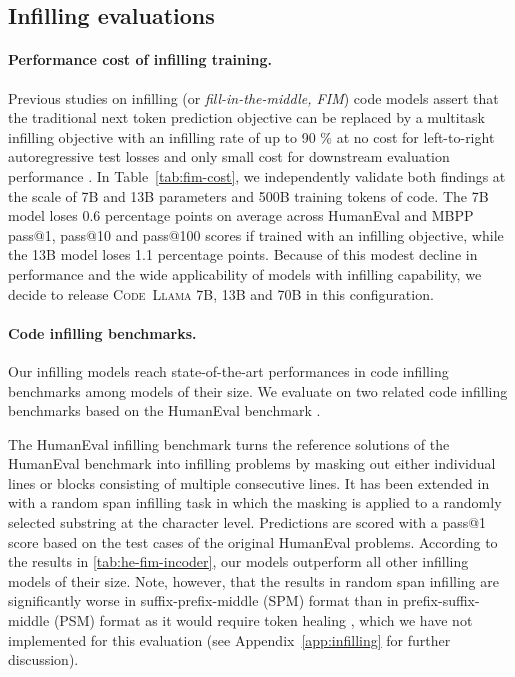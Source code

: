 \subsection{Infilling evaluations}\label{sec:infilling_evals}

\label{sec:fim_results}
\paragraph{Performance cost of infilling training.} Previous studies on infilling (or \emph{fill-in-the-middle, FIM}) code models assert that the traditional next token prediction objective can be replaced by a multitask infilling objective with an infilling rate of up to 90 \% at no cost for left-to-right autoregressive test losses \citep{bavarian2022efficient} and only small cost for downstream evaluation performance \citep{allal2023santacoder}. In Table~\ref{tab:fim-cost}, we independently validate both findings at the scale of 7B and 13B parameters and 500B training tokens of code. The 7B model loses 0.6 percentage points on average across HumanEval and MBPP pass@1, pass@10 and pass@100 scores if trained with an infilling objective, while the 13B model loses 1.1 percentage points. Because of this modest decline in performance and the wide applicability of models with infilling capability, we decide to release \textsc{Code~Llama} 7B, 13B and 70B in this configuration.

\paragraph{Code infilling benchmarks.} Our infilling models reach state-of-the-art performances in code infilling benchmarks among models of their size. We evaluate on two related code infilling benchmarks based on the HumanEval benchmark \citep{chen2021evaluating}.

The HumanEval infilling benchmark \citep{fried2022incoder} turns the reference solutions of the HumanEval benchmark \citep{chen2021evaluating} into infilling problems by masking out either individual lines or blocks consisting of multiple consecutive lines. It has been extended in \citet{bavarian2022efficient} with a random span infilling task in which the masking is applied to a randomly selected substring at the character level. Predictions are scored with a pass@1 score based on the test cases of the original HumanEval problems. According to the results in \ref{tab:he-fim-incoder}, our models outperform all other infilling models of their size. Note, however, that the results in random span infilling are significantly worse in suffix-prefix-middle (SPM) format than in prefix-suffix-middle (PSM) format as it would require token healing \citep{microsoft2023guidance}, which we have not implemented for this evaluation (see Appendix~\ref{app:infilling} for further discussion).

